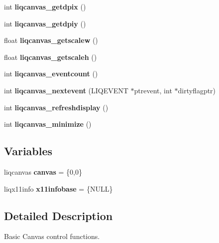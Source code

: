 \begin{CompactItemize}
\item 
int \textbf{liqcanvas\_\-getdpix} ()\label{d6/df5/liqcanvas_8c_7d7323a8800e98a655d67cc3ed4e9946}

\item 
int \textbf{liqcanvas\_\-getdpiy} ()\label{d6/df5/liqcanvas_8c_3c65cb417f9b07ff59f11d584760f0f4}

\item 
float \textbf{liqcanvas\_\-getscalew} ()\label{d6/df5/liqcanvas_8c_f29e0243e2f21bb79b7bc55303f146e9}

\item 
float \textbf{liqcanvas\_\-getscaleh} ()\label{d6/df5/liqcanvas_8c_7f39e5bb5f0c776611f917fe2611640b}

\item 
int \textbf{liqcanvas\_\-eventcount} ()\label{d6/df5/liqcanvas_8c_d4300d2ca82a952d316d0776fc57f176}

\item 
int \textbf{liqcanvas\_\-nextevent} (LIQEVENT $\ast$ptrevent, int $\ast$dirtyflagptr)\label{d6/df5/liqcanvas_8c_ccb34a151dea1651688c6589bf43d79b}

\item 
int \textbf{liqcanvas\_\-refreshdisplay} ()\label{d6/df5/liqcanvas_8c_3ea06cd9d4c7254f76482688dcd6d487}

\item 
int \textbf{liqcanvas\_\-minimize} ()\label{d6/df5/liqcanvas_8c_e217e0b92d56e9187d8ae315e4ced698}

\end{CompactItemize}
\subsection*{Variables}
\begin{CompactItemize}
\item 
liqcanvas \textbf{canvas} = \{0,0\}\label{d6/df5/liqcanvas_8c_fa7a1f9c5e3fce57ed09debb729058db}

\item 
liqx11info \textbf{x11infobase} = \{NULL\}\label{d6/df5/liqcanvas_8c_0a707be92792a14e9830e5ebe72d6d1b}

\end{CompactItemize}


\label{_details}
\subsection{Detailed Description}
Basic Canvas control functions. 

